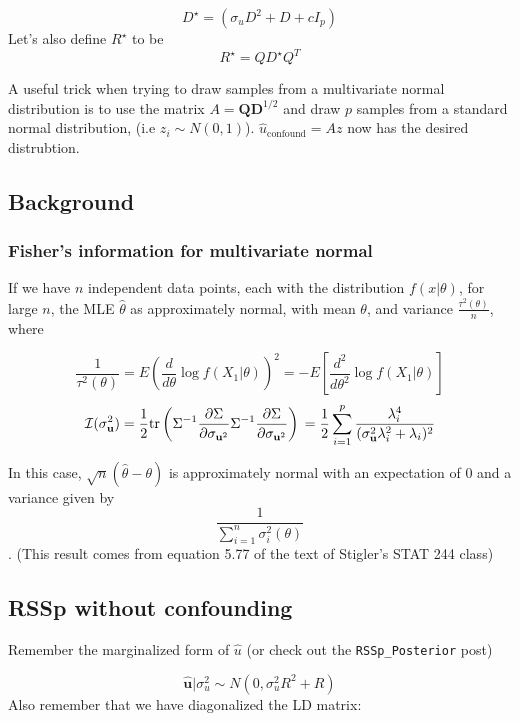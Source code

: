 $$D^{\star}=(\sigma_uD^2+D+c I_p)$$
Let's also define \(R^\star\) to be 
$$R^\star=Q D^{\star}Q^{T}$$

A useful trick when trying to draw samples from a multivariate normal distribution
is to use the matrix \(A=\textbf{Q}\textbf{D}^{1/2}\) and  draw \(p\) samples from a standard normal distribution, (i.e \(z_i \sim N(0,1)\)).  \(\hat{u}_{\text{confound}}=Az\) now has the desired distrubtion.




\subsection{Background}\label{sec:org13cff0e}

\subsubsection{Fisher's information for multivariate normal}\label{sec:orgc6a5fb9}

If we have \(n\) independent data points, each with the distribution \(f(x|\theta)\), for large \(n\), the MLE \(\hat{\theta}\) as approximately normal, with mean \(\theta\), and variance \(\frac{\tau^2(\theta)}{n}\), where 

$$ \frac{1}{\tau^2(\theta)}=E \left( \frac{d}{d \theta} \log f(X_1|\theta) \right)^2 = -E \left[ \frac{d^2}{d\theta^2} \log f(X_1|\theta) \right]$$
$$\mathcal{I}(\sigma_\textbf{u}^2)=\frac{1}{2}\text{tr}\left( \Sigma^{-1} \frac{\partial  \Sigma}{\partial \sigma_{\textbf{u}^2}}  \Sigma^{-1} \frac{\partial  \Sigma}{\partial \sigma_{\textbf{u}^2}} \right) \\ 
=\frac{1}{2}\sum_{i=1}^p \frac{\lambda_i^4}{(\sigma_\textbf{u}^2 \lambda_i^2+\lambda_i)^2} $$

In this case, \(\sqrt{n}(\hat{\theta}-\theta)\) is approximately normal with an expectation of \(0\)  and a variance given by $$\frac{1}{\sum_{i=1}^n \sigma_i^2(\theta)}$$.  (This result comes from equation 5.77 of the text of Stigler's STAT 244 class)



\subsection{RSSp without confounding}\label{sec:org68d2164}

Remember the marginalized form of \(\hat{u}\) (or check out the \texttt{RSSp\_Posterior} post)

$$ \hat{\textbf{u}}|\sigma_u^2 \sim N(0,\sigma_u^2R^2+R)$$
Also remember that we have diagonalized the LD matrix:

